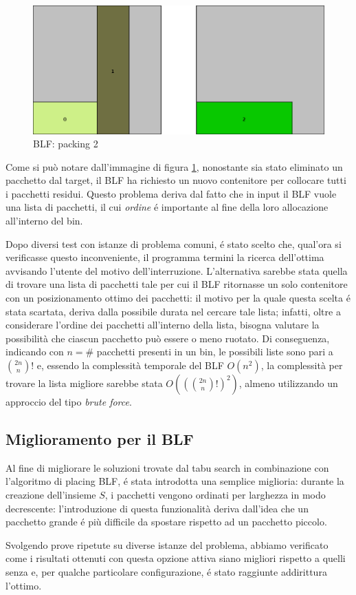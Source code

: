 \begin{figure}[htb]
  \centering
  \includegraphics[height=0.3\textwidth]{./img/inconv2.png}
  \caption{BLF: packing 2}
  \label{img:inconv2}
\end{figure}

Come si può notare dall'immagine di figura \ref{img:inconv2}, nonostante sia stato eliminato un pacchetto dal target, il BLF ha richiesto un nuovo contenitore per collocare tutti i pacchetti residui. Questo problema deriva dal fatto che in input il BLF vuole una lista di pacchetti, il cui \textit{ordine} é importante al fine della loro allocazione all'interno del bin.

Dopo diversi test con istanze di problema comuni, é stato scelto che, qual'ora si verificasse questo inconveniente, il programma termini la ricerca dell'ottima avvisando l'utente del motivo dell'interruzione. L'alternativa sarebbe stata quella di trovare una lista di pacchetti tale per cui il BLF ritornasse un solo contenitore con un posizionamento ottimo dei pacchetti: il motivo per la quale questa scelta é stata scartata, deriva dalla possibile durata nel cercare tale lista; infatti, oltre a considerare l'ordine dei pacchetti all'interno della lista, bisogna valutare la possibilità che ciascun pacchetto può essere o meno ruotato. Di conseguenza, indicando con $n = \#$ pacchetti presenti in un bin, le possibili liste sono pari a $\binom{2n}{n}!$ e, essendo la complessità temporale del BLF $O(n^2)$, la complessità per trovare la lista migliore sarebbe stata $O\left((\binom{2n}{n}!)^2\right)$, almeno utilizzando un approccio del tipo \textit{brute force}.

\subsection{Miglioramento per il BLF}
Al fine di migliorare le soluzioni trovate dal tabu search in combinazione con l'algoritmo di placing BLF, é stata introdotta una semplice miglioria: durante la creazione dell'insieme $S$, i pacchetti vengono ordinati per larghezza in modo decrescente: l'introduzione di questa funzionalità deriva dall'idea che un pacchetto grande é più difficile da spostare rispetto ad un pacchetto piccolo.

Svolgendo prove ripetute su diverse istanze del problema, abbiamo verificato come i risultati ottenuti con questa opzione attiva siano migliori rispetto a quelli senza e, per qualche particolare configurazione, é stato raggiunte addirittura l'ottimo.

